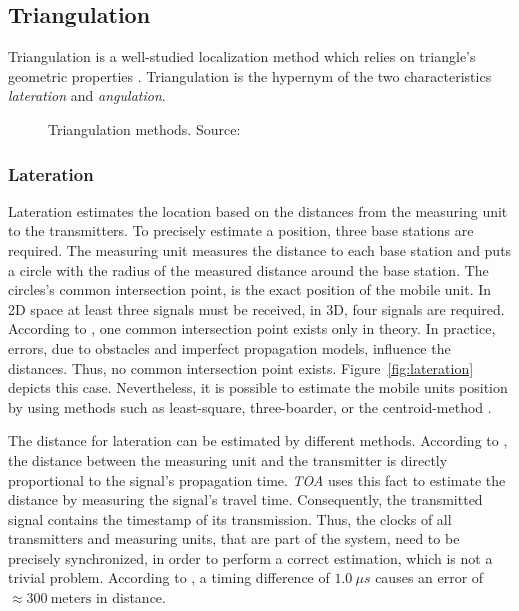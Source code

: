 \subsection{Triangulation}\label{sec:fund_trilateration}
Triangulation is a well-studied localization method which relies on triangle's geometric properties \citep{IEEE:survey_wireless_indoor_pos, wang:bt_pos}. Triangulation is the hypernym of the two characteristics \emph{lateration} and \emph{angulation}.

\begin{figure}[width=0.9\textwidth, height=0.4\textheight]
	
	\caption {Triangulation methods. Source:~\citep{wang:bt_pos}}
	\label{fig:triangulation}
\end{figure}

\subsubsection*{Lateration}
Lateration estimates the location based on the distances from the measuring unit to the transmitters. To precisely estimate a position, three base stations are required. The measuring unit measures the distance to each base station and puts a circle with the radius of the measured distance around the base station. The circles's common intersection point, is the exact position of the mobile unit. In 2D space at least three signals must be received, in 3D, four signals are required. According to \citet{wang:bt_pos}, one common intersection point exists only in theory. In practice, errors, due to obstacles and imperfect propagation models, influence the distances. Thus, no common intersection point exists. Figure~\ref{fig:lateration} depicts this case. Nevertheless, it is possible to estimate the mobile units position by using methods such as least-square, three-boarder, or the centroid-method \citep{wang:bt_pos, IEEE:survey_wireless_indoor_pos}.  

The distance for lateration can be estimated by different methods. According to \citet{IEEE:survey_wireless_indoor_pos}, the distance between the measuring unit and the transmitter is directly proportional to the signal's propagation time.
\emph{\ac{TOA}} uses this fact to estimate the distance by measuring the signal's travel time. Consequently, the transmitted signal contains the timestamp of its transmission. Thus, the clocks of all transmitters and measuring units, that are part of the system, need to be precisely synchronized, in order to perform a correct estimation, which is not a trivial problem. According to \citet{kotanen:exp_local_pos_bt}, a timing difference of  $1.0~\mu s$ causes an error of $\approx 300~\text{meters}$ in distance.

